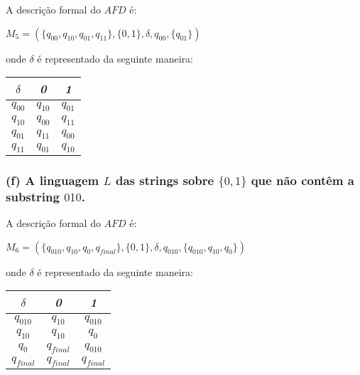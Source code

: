 \documentclass{article}
\begin{document}
A descrição formal do $AFD$ é:
\begin{center}
  $M_5 = (\{q_{00},q_{10},q_{01},q_{11}\}, \{0,1\},\delta,q_{00}, \{q_{01}\})$
\end{center}
onde $\delta$ é representado da seguinte maneira:
\begin{table}[htbp]
  \centering
  \begin{tabular}{c|cc}
    \textit{$\delta$} & \textit{0}        & \textit{1}        \\ \hline
    \textit{$q_{00}$} & \textit{$q_{10}$} & \textit{$q_{01}$} \\
    \textit{$q_{10}$} & \textit{$q_{00}$} & \textit{$q_{11}$} \\
    \textit{$q_{01}$} & \textit{$q_{11}$} & \textit{$q_{00}$} \\
    $q_{11}$          & $q_{01}$          & $q_{10}$
  \end{tabular}
\end{table}

\subsubsection*{(f) A linguagem $L$ das strings sobre $\{0, 1\}$ que não contêm a substring $010$.}

\begin{center}
\end{center}

A descrição formal do $AFD$ é:
\begin{center}
  $M_6 = (\{q_{010},q_{10},q_{0},q_{final}\}, \{0,1\},\delta,q_{010}, \{q_{010},q_{10},q_{0}\})$
\end{center}
\pagebreak
onde $\delta$ é representado da seguinte maneira:

\begin{table}[htbp]
  \centering
  \begin{tabular}{c|cc}
    \textit{$\delta$}  & \textit{0}           & \textit{1}         \\ \hline
    \textit{$q_{010}$} & \textit{$q_{10}$}    & \textit{$q_{010}$} \\
    \textit{$q_{10}$}  & \textit{$q_{10}$}    & \textit{$q_{0}$}   \\
    \textit{$q_{0}$}   & \textit{$q_{final}$} & \textit{$q_{010}$} \\
    $q_{final}$        & $q_{final}$          & $q_{final}$
  \end{tabular}
\end{table}
\end{document}

